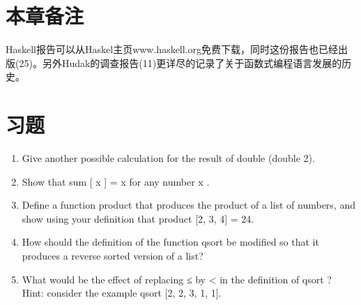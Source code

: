 \section{本章备注}
Haskell报告可以从Haskel主页www.haskell.org免费下载，同时这份报告也已经出版(25)。另外Hudak的调查报告(11)更详尽的记录了关于函数式编程语言发展的历史。 

\section{习题}
\begin{enumerate}
\item Give another possible calculation for the result of double (double 2).
\item Show that sum [ x ] = x for any number x .
\item Define a function product that produces the product of a list of numbers, and show using your definition that product [2, 3, 4] = 24.
\item How should the definition of the function qsort be modified so that it
produces a reverse sorted version of a list?
\item What would be the effect of replacing ≤ by < in the definition of qsort ?\\ Hint: consider the example qsort [2, 2, 3, 1, 1].
\end{enumerate}

